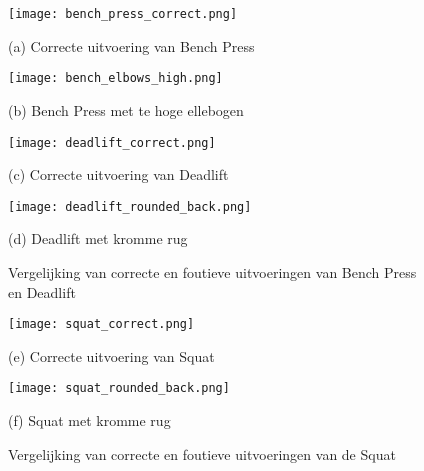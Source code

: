 \begin{figure}[H]
    \centering

    \begin{minipage}{0.45\textwidth}
        \centering
        \texttt{[image: bench\_press\_correct.png]}
        \caption*{(a) Correcte uitvoering van Bench Press}
        \label{fig:bench_correct_combined}
    \end{minipage}
    \hfill
    \begin{minipage}{0.45\textwidth}
        \centering
        \texttt{[image: bench\_elbows\_high.png]}
        \caption*{(b) Bench Press met te hoge ellebogen}
        \label{fig:bench_elbows_high_combined}
    \end{minipage}

    \vspace{1em}

    \begin{minipage}{0.45\textwidth}
        \centering
        \texttt{[image: deadlift\_correct.png]}
        \caption*{(c) Correcte uitvoering van Deadlift}
        \label{fig:deadlift_correct_combined}
    \end{minipage}
    \hfill
    \begin{minipage}{0.45\textwidth}
        \centering
        \texttt{[image: deadlift\_rounded\_back.png]}
        \caption*{(d) Deadlift met kromme rug}
        \label{fig:deadlift_rounded_back_combined}
    \end{minipage}

    \caption{Vergelijking van correcte en foutieve uitvoeringen van Bench Press en Deadlift}
    \label{fig:bench_deadlift_comparison}
\end{figure}

\begin{figure}[H]
    \centering

    \begin{minipage}{0.45\textwidth}
        \centering
        \texttt{[image: squat\_correct.png]}
        \caption*{(e) Correcte uitvoering van Squat}
        \label{fig:squat_correct_combined}
    \end{minipage}
    \hfill
    \begin{minipage}{0.45\textwidth}
        \centering
        \texttt{[image: squat\_rounded\_back.png]}
        \caption*{(f) Squat met kromme rug}
        \label{fig:squat_rounded_back_combined}
    \end{minipage}

    \caption{Vergelijking van correcte en foutieve uitvoeringen van de Squat}
    \label{fig:squat_comparison}
\end{figure}

